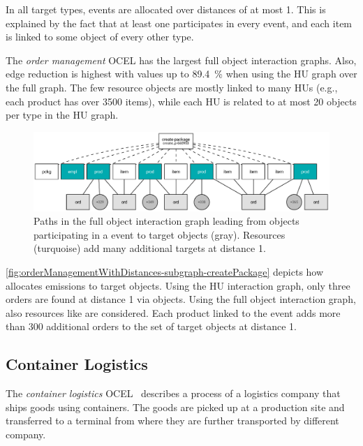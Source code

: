 In all target types, events are allocated over distances of at most 1. This is explained by the fact that at least one  participates in every event, and each item is linked to some object of every other type.

The \textit{order management} OCEL has the largest full object interaction graphs. Also, edge reduction is highest with values up to \qty{89.4}{\percent} when using the HU graph over the full graph. The few resource objects are mostly linked to many HUs (e.g., each product has over 3500 items), while each HU is related to at most 20 objects per type in the HU graph.

\begin{figure}[t]
  \centering
  \includegraphics[width=\textwidth]{figures/20240910-210329-orderManagementWithDistances-og-subgraph-163fbff1.pdf}
  \caption{Paths in the full object interaction graph leading from objects participating in a  event to  target objects (gray). Resources (turquoise) add many additional targets at distance 1.}
  \label{fig:orderManagementWithDistances-subgraph-createPackage}
\end{figure}

\autoref{fig:orderManagementWithDistances-subgraph-createPackage}
depicts how  allocates emissions to  target objects. Using the HU interaction graph, only three orders are found at distance 1 via  objects.
Using the full object interaction graph, also resources like  are considered.
Each product linked to the event adds more than 300 additional orders to the set of target objects at distance 1.

\subsection{Container Logistics}
\label{ssec:eva-results-containerLogistics}

The \textit{container logistics} OCEL~\cite{containerLogistics}
describes a process of a logistics company that ships goods using containers.
The goods are picked up at a production site and transferred to a terminal from where they are further transported by different company.

